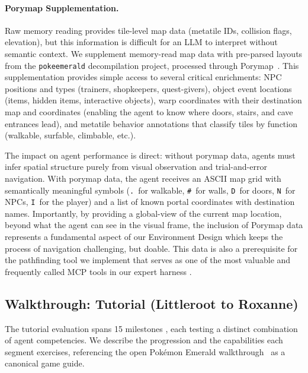 \paragraph{Porymap Supplementation.} Raw memory reading provides tile-level map data (metatile IDs, collision flags, elevation), but this information is difficult for an LLM to interpret without semantic context. We supplement memory-read map data with pre-parsed layouts from the \texttt{pokeemerald} decompilation project, processed through Porymap~\citep{huderlem2025porymap}. This supplementation provides simple access to several critical enrichments: NPC positions and types (trainers, shopkeepers, quest-givers), object event locations (items, hidden items, interactive objects), warp coordinates with their destination map and coordinates (enabling the agent to know where doors, stairs, and cave entrances lead), and metatile behavior annotations that classify tiles by function (walkable, surfable, climbable, etc.).

The impact on agent performance is direct: without porymap data, agents must infer spatial structure purely from visual observation and trial-and-error navigation. With porymap data, the agent receives an ASCII map grid with semantically meaningful symbols (\texttt{.}~for walkable, \texttt{\#}~for walls, \texttt{D}~for doors, \texttt{N}~for NPCs, \texttt{I}~for the player) and a list of known portal coordinates with destination names. Importantly, by providing a global-view of the current map location, beyond what the agent can see in the visual frame, the inclusion of Porymap data represents a fundamental aspect of our Environment Design which keeps the process of navigation challenging, but doable. This data is also a prerequisite for the pathfinding tool we implement that serves as one of the most valuable and frequently called MCP tools in our expert harness .

\subsection{Walkthrough: Tutorial (Littleroot to Roxanne)}\label{sec:appendix_tutorial_walkthrough}

The tutorial evaluation spans 15 milestones , each testing a distinct combination of agent competencies. We describe the progression and the capabilities each segment exercises, referencing the open Pok\'{e}mon Emerald walkthrough~\citep{bulbapedia2025walkthrough} as a canonical game guide.

